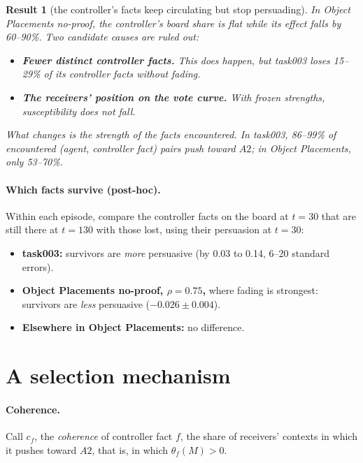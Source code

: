 \documentclass[10pt,a4paper]{article}
\newtheorem{result}{Result}
\begin{document}
\begin{result}[the controller's facts keep circulating but stop persuading]
In Object Placements no-proof, the controller's board share is flat while its effect falls by 60--90\%. Two candidate
causes are ruled out:
\begin{itemize}
\item \textbf{Fewer distinct controller facts.} This does happen, but task003 loses 15--29\% of its controller facts
  without fading.
\item \textbf{The receivers' position on the vote curve.} With frozen strengths, susceptibility does not fall.
\end{itemize}
What changes is the strength of the facts encountered. In task003, 86--99\% of encountered (agent, controller fact)
pairs push toward $A2$; in Object Placements, only 53--70\%.
\end{result}

\paragraph{Which facts survive (post-hoc).} Within each episode, compare the controller facts on the board at $t=30$ that
are still there at $t=130$ with those lost, using their persuasion at $t=30$:
\begin{itemize}
\item \textbf{task003:} survivors are \emph{more} persuasive (by 0.03 to 0.14, 6--20 standard errors).
\item \textbf{Object Placements no-proof, $\rho=0.75$,} where fading is strongest: survivors are \emph{less} persuasive
  ($-0.026\pm0.004$).
\item \textbf{Elsewhere in Object Placements:} no difference.
\end{itemize}

\section{A selection mechanism}
\label{sec:selection}
\paragraph{Coherence.} Call $c_f$, the \emph{coherence} of controller fact $f$, the share of receivers' contexts in which
it pushes toward $A2$, that is, in which $\theta_f(M)>0$.
\end{document}
